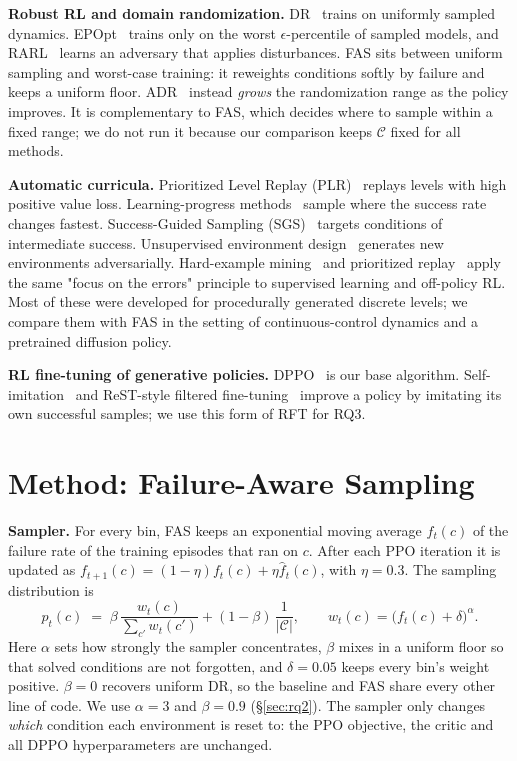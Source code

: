\documentclass{article}
\newcommand{\fas}{\textsc{FAS}}
\newcommand{\C}{\mathcal{C}}
\begin{document}
\textbf{Robust RL and domain randomization.} DR~\citep{tobin2017dr,peng2018sim2real} trains on uniformly sampled dynamics.
EPOpt~\citep{rajeswaran2017epopt} trains only on the worst $\epsilon$-percentile of sampled models, and RARL~\citep{pinto2017rarl} learns an adversary that applies disturbances.
\fas{} sits between uniform sampling and worst-case training: it reweights conditions softly by failure and keeps a uniform floor.
ADR~\citep{akkaya2019rubik} instead \emph{grows} the randomization range as the policy improves. It is complementary to \fas{}, which decides where to sample within a fixed range; we do not run it because our comparison keeps $\C$ fixed for all methods.

\textbf{Automatic curricula.} Prioritized Level Replay (PLR)~\citep{jiang2021plr} replays levels with high positive value loss.
Learning-progress methods~\citep{portelas2020alpgmm} sample where the success rate changes fastest.
Success-Guided Sampling (SGS)~\citep{zhang2026sgs} targets conditions of intermediate success.
Unsupervised environment design~\citep{dennis2020paired} generates new environments adversarially.
Hard-example mining~\citep{shrivastava2016ohem} and prioritized replay~\citep{schaul2016per} apply the same "focus on the errors" principle to supervised learning and off-policy RL.
Most of these were developed for procedurally generated discrete levels; we compare them with \fas{} in the setting of continuous-control dynamics and a pretrained diffusion policy.

\textbf{RL fine-tuning of generative policies.} DPPO~\citep{ren2025dppo} is our base algorithm.
Self-imitation~\citep{oh2018sil} and ReST-style filtered fine-tuning~\citep{gulcehre2023rest} improve a policy by imitating its own successful samples; we use this form of RFT for RQ3.

\section{Method: Failure-Aware Sampling}
\label{sec:method}

\textbf{Sampler.} For every bin, \fas{} keeps an exponential moving average $f_t(c)$ of the failure rate of the training episodes that ran on $c$. After each PPO iteration it is updated as $f_{t+1}(c) = (1-\eta) f_t(c) + \eta \hat f_t(c)$, with $\eta=0.3$.
The sampling distribution is
\begin{equation}
p_t(c) \;=\; \beta \,\frac{w_t(c)}{\sum_{c'} w_t(c')} + (1-\beta)\,\frac{1}{|\C|}, \qquad w_t(c) = \big(f_t(c) + \delta\big)^{\alpha}.
\label{eq:fas}
\end{equation}
Here $\alpha$ sets how strongly the sampler concentrates, $\beta$ mixes in a uniform floor so that solved conditions are not forgotten, and $\delta=0.05$ keeps every bin's weight positive.
$\beta=0$ recovers uniform DR, so the baseline and \fas{} share every other line of code.
We use $\alpha=3$ and $\beta=0.9$ (\S\ref{sec:rq2}).
The sampler only changes \emph{which} condition each environment is reset to: the PPO objective, the critic and all DPPO hyperparameters are unchanged.
\end{document}
